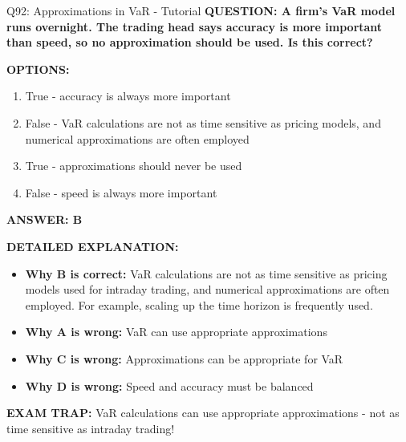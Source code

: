 \documentclass[8pt]{beamer}
\begin{document}
	\begin{frame}{Q92: Approximations in VaR - Tutorial}
		\fontsize{6.5}{7.5}\selectfont
		\textbf{QUESTION: A firm's VaR model runs overnight. The trading head says accuracy is more important than speed, so no approximation should be used. Is this correct?}
		
		\vspace{0.1cm}
		\textbf{OPTIONS:}
		\begin{enumerate}
			\item True - accuracy is always more important
			\item False - VaR calculations are not as time sensitive as pricing models, and numerical approximations are often employed
			\item True - approximations should never be used
			\item False - speed is always more important
		\end{enumerate}
		
		\vspace{0.1cm}
		\textcolor{myblue}{\textbf{ANSWER: B}}
		
		\vspace{0.1cm}
		\textbf{DETAILED EXPLANATION:}
		\begin{itemize}
			\item \textbf{Why B is correct:} VaR calculations are not as time sensitive as pricing models used for intraday trading, and numerical approximations are often employed. For example, scaling up the time horizon is frequently used.
			\item \textbf{Why A is wrong:} VaR can use appropriate approximations
			\item \textbf{Why C is wrong:} Approximations can be appropriate for VaR
			\item \textbf{Why D is wrong:} Speed and accuracy must be balanced
		\end{itemize}
		
		\textcolor{myred}{\textbf{EXAM TRAP:}} VaR calculations can use \textcolor{myblue}{appropriate approximations} - not as time sensitive as intraday trading!
	\end{frame}
	
\end{document}
